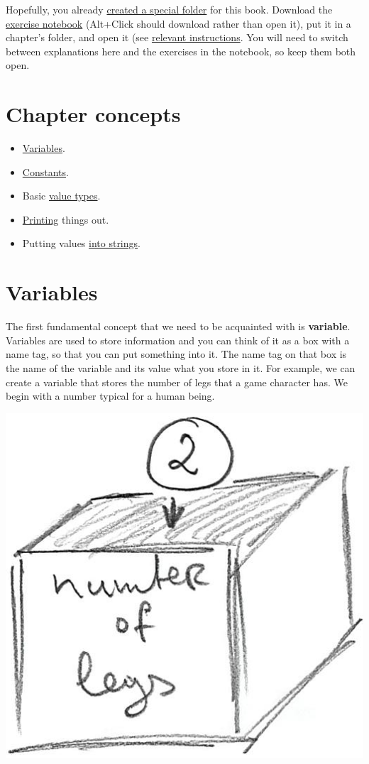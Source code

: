 \documentclass[
]{book}
\providecommand{\tightlist}{%
  \setlength{\itemsep}{0pt}\setlength{\parskip}{0pt}}
\begin{document}
Hopefully, you already \protect\hyperlink{files-folder}{created a special folder} for this book. Download the \href{notebooks/Basics.ipynb}{exercise notebook} (Alt+Click should download rather than open it), put it in a chapter's folder, and open it (see \protect\hyperlink{jupyter-notebooks}{relevant instructions}. You will need to switch between explanations here and the exercises in the notebook, so keep them both open.

\hypertarget{chapter-concepts}{%
\section{Chapter concepts}\label{chapter-concepts}}

\begin{itemize}
\tightlist
\item
  \protect\hyperlink{variables}{Variables}.
\item
  \protect\hyperlink{constants}{Constants}.
\item
  Basic \protect\hyperlink{value-types}{value types}.
\item
  \protect\hyperlink{print}{Printing} things out.
\item
  Putting values \protect\hyperlink{string-formatting}{into strings}.
\end{itemize}

\hypertarget{variables}{%
\section{Variables}\label{variables}}

The first fundamental concept that we need to be acquainted with is \textbf{variable}. Variables are used to store information and you can think of it as a box with a name tag, so that you can put something into it. The name tag on that box is the name of the variable and its value what you store in it. For example, we can create a variable that stores the number of legs that a game character has. We begin with a number typical for a human being.

\begin{center}\includegraphics[width=0.5\linewidth]{images/variable-as-box} \end{center}
\end{document}
